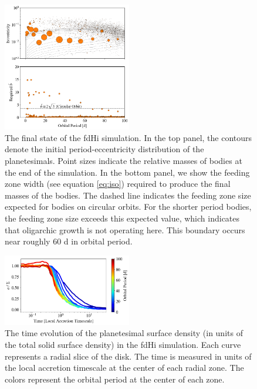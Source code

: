 \begin{figure}
\begin{center}
    \includegraphics[width=0.5\textwidth]{figures/plStip/fulldisk_e_m_b.png}
    \caption{The final state of the fdHi simulation. In the top panel,
      the contours denote the initial period-eccentricity distribution
      of the planetesimals. Point sizes indicate the relative masses
      of bodies at the end of the simulation. In the bottom panel, we show the
      feeding zone width (see equation \ref{eq:iso}) required to produce
      the final masses of the bodies. The dashed line indicates the feeding
      zone size expected for bodies on circular orbits. For the shorter period bodies,
      the feeding zone size exceeds this expected value, which indicates that oligarchic growth is
      not operating here. This boundary occurs near roughly 60 d in orbital period.\label{fig:fulldisk_e_m}}
\end{center}
\end{figure}

\begin{figure}
\begin{center}
    \includegraphics[width=0.5\textwidth]{figures/plStip/pl_frac_time.png}
    \caption{The time evolution of the planetesimal surface density (in units of the total solid surface density) in the fdHi 
    simulation. Each curve represents a radial slice of the disk. The time is measured in units of the local accretion 
    timescale at the center of each radial zone. The colors represent the orbital period at the center of each zone.\label{fig:pl_frac_time}}
\end{center}
\end{figure}

